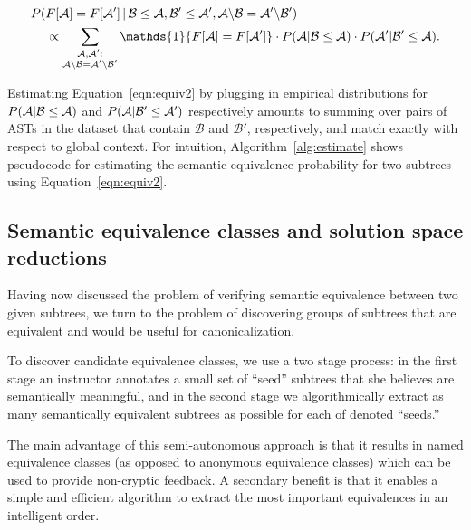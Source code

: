 {\scriptsize
\begin{align}
P(&F[\AST] = F[\AST'] \,|\, \mathcal{B}\leq \AST, \mathcal{B}' \leq \AST', \AST\backslash \mathcal{B} =\AST'\backslash \mathcal{B}')  \\
 &\propto \sum_{\substack{\AST,\AST': \\ \AST\backslash \mathcal{B} = \AST'\backslash\mathcal{B'}}} \mathds{1}\{F[\AST] = F[\AST'] \}  \cdot P(\AST | \mathcal{B}\leq\AST) \cdot P(\AST'|\mathcal{B}'\leq \mathcal{A}) \label{eqn:equiv2}.
\end{align}
}

Estimating Equation~\ref{eqn:equiv2}  by plugging  in empirical distributions for $P(\mathcal{A} | \mathcal{B}\leq\mathcal{A}) $ and $P(\mathcal{A} | \mathcal{B}'\leq\mathcal{A}')$ 
respectively amounts to summing over pairs of ASTs in the dataset that contain $\mathcal{B}$ and $\mathcal{B}'$, respectively, and match exactly
with respect to global context.
For intuition, Algorithm~\ref{alg:estimate} shows pseudocode for estimating the semantic equivalence
probability for two subtrees using Equation~\ref{eqn:equiv2}.  


\subsection{Semantic equivalence classes and solution space reductions}	\label{sec:reduction}
Having now discussed the problem of verifying semantic equivalence between two given subtrees,
we turn to the problem of discovering groups of subtrees that are equivalent and would be useful for canonicalization.

To discover candidate equivalence classes, we use a two stage process: in the first stage an instructor annotates a small set of ``seed'' subtrees 
that she believes are semantically meaningful, and in the second stage we algorithmically extract as many semantically equivalent subtrees as possible for each of denoted ``seeds.'' 

The main advantage of this semi-autonomous approach is that it results in named equivalence 
classes (as opposed to anonymous equivalence classes) which can be used to provide non-cryptic feedback. A secondary benefit 
is that it enables a simple and efficient algorithm to extract the most important equivalences in an intelligent order.

